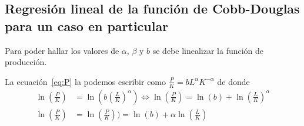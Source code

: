 \subsection{Regresión lineal de la función de Cobb-Douglas para un caso en particular}

Para poder hallar los valores de $\alpha$, $\beta$ y $b$ se debe linealizar la función de producción.

La ecuación~\eqref{eq:P} la podemos escribir como $\frac{P}{K}=bL^{\alpha}K^{-\alpha}$ de donde
\begin{align*}
\ln\left(\frac{P}{K}\right)
&=\ln\left(b\left(\frac{L}{K}\right)^{\alpha}\right)\iff\ln\left(\frac{P}{K}\right)=\ln\left(b\right)+\ln\left(\frac{L}{K}\right)^{\alpha}\\
\ln\left(\frac{P}{K}\right)
&=\ln\left(\frac{P}{K}\right))=\ln\left(b\right)+\alpha\ln\left(\frac{L}{K}\right)
\end{align*}
